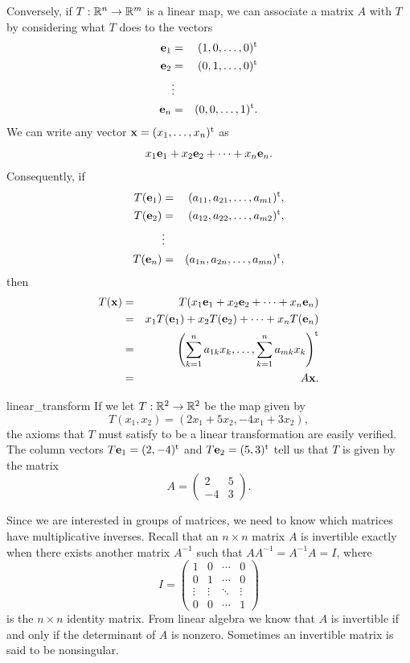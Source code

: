  
Conversely, if $T : {\Bbb R}^n \rightarrow {\Bbb R}^m$ is a linear
map, we can associate a matrix $A$ with $T$ by considering what $T$
does to the vectors 
\begin{eqnarray*}
{\bold e}_1 & = & (1, 0, \ldots, 0)^{\rm t} \\
{\bold e}_2 & = & (0, 1, \ldots, 0)^{\rm t} \\
            &  \vdots &  \\
{\bold e}_n & = & (0, 0, \ldots, 1)^{\rm t}.
\end{eqnarray*}
We can write any vector ${\bold x} = (x_1, \ldots, x_n)^{\rm t}$ as
\[
x_1 {\bold e}_1 + x_2 {\bold e}_2 + \cdots + x_n {\bold e}_n.
\]
Consequently, if
\begin{eqnarray*}
T({\bold e}_1) & = & (a_{11}, a_{21}, \ldots, a_{m1})^{\rm t}, \\
T({\bold e}_2) & = & (a_{12}, a_{22}, \ldots, a_{m2})^{\rm t}, \\
            &  \vdots &  \\
T({\bold e}_n) & = & (a_{1n}, a_{2n}, \ldots, a_{mn})^{\rm t},
\end{eqnarray*}
then
\begin{eqnarray*}
T({\bold x} )
& = &
T(x_1 {\bold e}_1 + x_2 {\bold e}_2 + \cdots + x_n {\bold e}_n) \\
& = &
x_1 T({\bold e}_1) + x_2 T({\bold e}_2) + \cdots + x_n T({\bold e}_n)
\\ 
& = &
\left( \sum_{k=1}^{n} a_{1k} x_k, \ldots,  \sum_{k=1}^{n} a_{mk} x_k
\right)^{\rm t} \\ 
& = & 
A {\bold x}.
\end{eqnarray*}
 
 
\begin{example}{linear_transform}
If we let $T : {\Bbb R}^2 \rightarrow {\Bbb R}^2$ be the map given by 
\[
T(x_1, x_2) = (2 x_1 + 5 x_2, - 4 x_1 + 3 x_2),
\]
the axioms that $T$ must satisfy to be a linear transformation are
easily verified. The column vectors $T {\bold e}_1 = (2, -4)^{\rm t}$
and $T {\bold e}_2 = (5,3)^{\rm t}$  tell us that $T$ is given by the
matrix 
\[
A =
\left(
\begin{array}{cc}
2 & 5 \\
-4 & 3
\end{array}
\right).
\]
\end{example}
 
 
Since we are interested in groups of matrices, we need to know
which matrices have multiplicative inverses. Recall that an $n \times
n$ matrix $A$ is {\bfi invertible\/} exactly
when there exists another matrix $A^{-1}$ such that $A A^{-1} = A^{-1}
A = I$, where 
\[
I =
\left(
\begin{array}{cccc}
1 & 0 & \cdots & 0 \\
0 & 1 & \cdots & 0 \\
\vdots & \vdots & \ddots & \vdots \\
0 & 0 & \cdots & 1
\end{array}
\right)
\]
is the $n \times n$ identity matrix. From linear algebra we know that
$A$ is invertible if and only if the determinant of $A$ is nonzero.
Sometimes an invertible matrix is said to be {\bfi
nonsingular}. 
 
